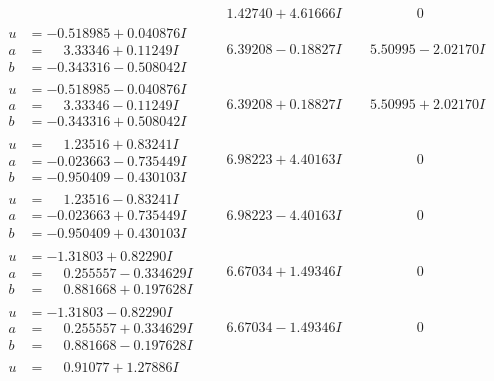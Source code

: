 \documentclass[1p]{elsarticle_modified}
\theoremstyle{definition}
\begin{document}
$$\begin{array}{c|c|c}
 & \phantom{-}1.42740 + 4.61666 I & \phantom{-0.000000 } 0 \\ \hline\begin{aligned}
u &= -0.518985 + 0.040876 I \\
a &= \phantom{-}3.33346 + 0.11249 I \\
b &= -0.343316 - 0.508042 I\end{aligned}
 & \phantom{-}6.39208 - 0.18827 I & \phantom{-}5.50995 - 2.02170 I \\ \hline\begin{aligned}
u &= -0.518985 - 0.040876 I \\
a &= \phantom{-}3.33346 - 0.11249 I \\
b &= -0.343316 + 0.508042 I\end{aligned}
 & \phantom{-}6.39208 + 0.18827 I & \phantom{-}5.50995 + 2.02170 I \\ \hline\begin{aligned}
u &= \phantom{-}1.23516 + 0.83241 I \\
a &= -0.023663 - 0.735449 I \\
b &= -0.950409 - 0.430103 I\end{aligned}
 & \phantom{-}6.98223 + 4.40163 I & \phantom{-0.000000 } 0 \\ \hline\begin{aligned}
u &= \phantom{-}1.23516 - 0.83241 I \\
a &= -0.023663 + 0.735449 I \\
b &= -0.950409 + 0.430103 I\end{aligned}
 & \phantom{-}6.98223 - 4.40163 I & \phantom{-0.000000 } 0 \\ \hline\begin{aligned}
u &= -1.31803 + 0.82290 I \\
a &= \phantom{-}0.255557 - 0.334629 I \\
b &= \phantom{-}0.881668 + 0.197628 I\end{aligned}
 & \phantom{-}6.67034 + 1.49346 I & \phantom{-0.000000 } 0 \\ \hline\begin{aligned}
u &= -1.31803 - 0.82290 I \\
a &= \phantom{-}0.255557 + 0.334629 I \\
b &= \phantom{-}0.881668 - 0.197628 I\end{aligned}
 & \phantom{-}6.67034 - 1.49346 I & \phantom{-0.000000 } 0 \\ \hline\begin{aligned}
u &= \phantom{-}0.91077 + 1.27886 I \\

\end{aligned}
\end{array}$$
\end{document}
